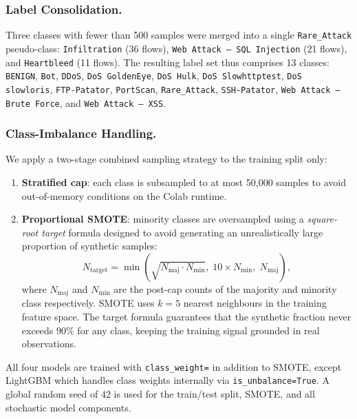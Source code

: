 \subsubsection*{Label Consolidation.}
Three classes with fewer than 500 samples were merged into a single \texttt{Rare\_Attack} pseudo-class: \texttt{Infiltration} (36 flows), \texttt{Web Attack -- SQL Injection} (21 flows), and \texttt{Heartbleed} (11 flows). The resulting label set thus comprises 13 classes: \texttt{BENIGN}, \texttt{Bot}, \texttt{DDoS}, \texttt{DoS GoldenEye}, \texttt{DoS Hulk}, \texttt{DoS Slowhttptest}, \texttt{DoS slowloris}, \texttt{FTP-Patator}, \texttt{PortScan}, \texttt{Rare\_Attack}, \texttt{SSH-Patator}, \texttt{Web Attack -- Brute Force}, and \texttt{Web Attack -- XSS}.

\subsubsection*{Class-Imbalance Handling.}
We apply a two-stage combined sampling strategy to the training split only:

\begin{enumerate}
    \item \textbf{Stratified cap}: each class is subsampled to at most 50,000 samples to avoid out-of-memory conditions on the Colab runtime.
    \item \textbf{Proportional SMOTE}: minority classes are oversampled using a \emph{square-root target} formula designed to avoid generating an unrealistically large proportion of synthetic samples:
    \begin{equation}
        N_{\text{target}} = \min\!\left(\sqrt{N_{\text{maj}} \cdot N_{\text{min}}},\; 10 \times N_{\text{min}},\; N_{\text{maj}}\right),
    \end{equation}
    where $N_{\text{maj}}$ and $N_{\text{min}}$ are the post-cap counts of the majority and minority class respectively. SMOTE uses $k=5$ nearest neighbours in the training feature space. The target formula guarantees that the synthetic fraction never exceeds $90\%$ for any class, keeping the training signal grounded in real observations.
\end{enumerate}

\noindent All four models are trained with \texttt{class\_weight=} in addition to SMOTE, except LightGBM which handles class weights internally via \texttt{is\_unbalance=True}. A global random seed of $42$ is used for the train/test split, SMOTE, and all stochastic model components.
